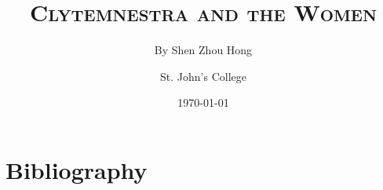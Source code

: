 \documentclass[12pt, a4paper, final, onecolumn, titlepage]{article}
\title{\textbf{\textsc{Clytemnestra and the Women}}}
\author{By Shen Zhou Hong \and St. John's College}
\date{\today}
\begin{document}
\maketitle
\tableofcontents
\clearpage



\clearpage
\nocite{*}
\section{Bibliography}
\printbibliography[heading=none]

\end{document}
